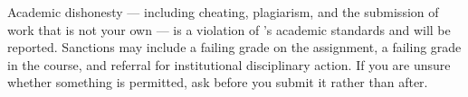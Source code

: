Academic dishonesty --- including cheating, plagiarism, and the submission of
work that is not your own --- is a violation of \GetInstitution's academic
standards and will be reported. Sanctions may include a failing grade on the
assignment, a failing grade in the course, and referral for institutional
disciplinary action. If you are unsure whether something is permitted, ask
before you submit it rather than after.
